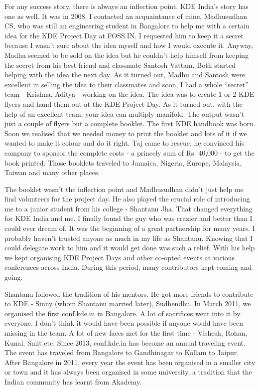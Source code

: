 For any success story, there is always an inflection point. KDE India's story has one as well. It was in 2008. I contacted an acquaintance of mine, Madhusudhan CS, who was still an engineering student in Bangalore to help me with a certain idea for the KDE Project Day at FOSS.IN. I requested him to keep it a secret because I wasn't sure about the idea myself and how I would execute it. Anyway, Madhu seemed to be sold on the idea but he couldn't help himself from keeping the secret from his best friend and classmate Santosh Vattam. Both started helping with the idea the next day. As it turned out, Madhu and Santosh were excellent in selling the idea to their classmates and soon, I had a whole “secret” team - Krishna, Aditya - working on the idea. The idea was to create 1 or 2 KDE flyers and hand them out at the KDE Project Day. As it turned out, with the help of an excellent team, your idea can multiply manifold. The output wasn't just a couple of flyers but a complete booklet. The first KDE handbook was born. Soon we realised that we needed money to print the booklet and lots of it if we wanted to make it colour and do it right. Taj came to rescue, he convinced his company to sponsor the complete costs - a princely sum of Rs. 40,000 - to get the book printed. Those booklets traveled to Jamaica, Nigeria, Europe, Malaysia, Taiwan and many other places.

The booklet wasn't the inflection point and Madhusudhan didn't just help me find volunteers for the project day. He also played the crucial role of introducing me to a junior student from his college - Shantanu Jha. That changed everything for KDE India and me. I finally found the guy who was crazier and better than I could ever dream of. It was the beginning of a great partnership for many years. I probably haven't trusted anyone as much in my life as Shantanu. Knowing that I could delegate work to him and it would get done was such a relief. With his help we kept organising KDE Project Days and other co-opted events at various conferences across India. During this period, many contributors kept coming and going.

Shantanu followed the tradition of his mentors. He got more friends to contribute to KDE - Sinny (whom Shantanu married later), Sudhendhu. In March 2011, we organised the first conf.kde.in in Bangalore. A lot of sacrifices went into it by everyone. I don't think it would have been possible if anyone would have been missing in the team. A lot of new faces met for the first time - Vishesh, Rohan, Kunal, Smit etc. Since 2013, conf.kde.in has become an annual traveling event. The event has traveled from Bangalore to Gandhinagar to Kollam to Jaipur. After Bangalore in 2011, every year the event has been organised in a smaller city or town and it has always been organised in some university, a tradition that the Indian community has learnt from Akademy.

